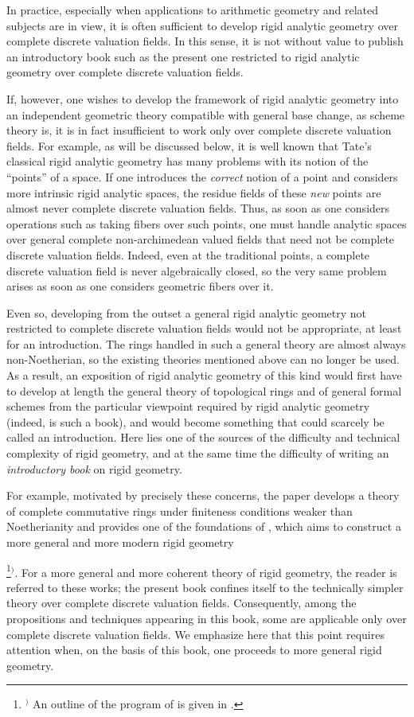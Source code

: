 \documentclass[a4paper,12pt, dvipdfmx]{jsbook}
\theoremstyle{plain}
\theoremstyle{definition}
\newcounter{chushaku}
\def\chu#1{\addtocounter{chushaku}{1}\footnote[\value{chushaku}]{${}^)$ #1}${}^)$}
\begin{document}
In practice, especially when applications to arithmetic geometry and related subjects are in view, it is often sufficient to develop rigid analytic geometry over complete discrete valuation fields.
In this sense, it is not without value to publish an introductory book such as the present one restricted to rigid analytic geometry over complete discrete valuation fields.

If, however, one wishes to develop the framework of rigid analytic geometry into an independent geometric theory compatible with general base change, as scheme theory is, it is in fact insufficient to work only over complete discrete valuation fields.
For example, as will be discussed below, it is well known that Tate's classical rigid analytic geometry has many problems with its notion of the ``points'' of a space.
If one introduces the {\it correct} notion of a point and considers more intrinsic rigid analytic spaces, the residue fields of these {\it new} points are almost never complete discrete valuation fields.
Thus, as soon as one considers operations such as taking fibers over such points, one must handle analytic spaces over general complete non-archimedean valued fields that need not be complete discrete valuation fields.
Indeed, even at the traditional points, a complete discrete valuation field is never algebraically closed, so the very same problem arises as soon as one considers geometric fibers over it.

Even so, developing from the outset a general rigid analytic geometry not restricted to complete discrete valuation fields would not be appropriate, at least for an introduction.
The rings handled in such a general theory are almost always non-Noetherian, so the existing theories mentioned above can no longer be used.
As a result, an exposition of rigid analytic geometry of this kind would first have to develop at length the general theory of topological rings and of general formal schemes from the particular viewpoint required by rigid analytic geometry (indeed, \cite{FK} is such a book), and would become something that could scarcely be called an introduction.
Here lies one of the sources of the difficulty and technical complexity of rigid geometry, and at the same time the difficulty of writing an {\it introductory book} on rigid geometry.

For example, motivated by precisely these concerns, the paper \cite{FGK} develops a theory of complete commutative rings under finiteness conditions weaker than Noetherianity and provides one of the foundations of \cite{FK}, which aims to construct a more general and more modern rigid geometry\chu{An outline of the program of \cite{FK} is given in \cite{FK0}.}.
For a more general and more coherent theory of rigid geometry, the reader is referred to these works; the present book confines itself to the technically simpler theory over complete discrete valuation fields.
Consequently, among the propositions and techniques appearing in this book, some are applicable only over complete discrete valuation fields.
We emphasize here that this point requires attention when, on the basis of this book, one proceeds to more general rigid geometry.
\end{document}
